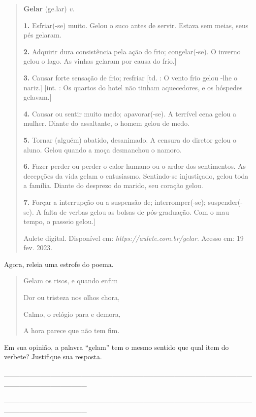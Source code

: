 \begin{quote}
\textbf{Gelar} (ge.lar)
\textit{v.}

\textbf{1.} Esfriar(-se) muito.
Gelou o suco antes de servir.
Estava sem meias, seus pés gelaram.

\textbf{2.} Adquirir dura consistência pela ação do frio; congelar(-se).
O inverno gelou o lago.
As vinhas gelaram por causa do frio.]

\textbf{3.} Causar forte sensação de frio; resfriar [td. : O vento frio gelou -lhe o nariz.] [int. : Os quartos do hotel não tinham aquecedores, e os hóspedes gelavam.]

\textbf{4.} Causar ou sentir muito medo; apavorar(-se).
A terrível cena gelou a mulher.
Diante do assaltante, o homem gelou de medo.

\textbf{5.} Tornar (alguém) abatido, desanimado.
A censura do diretor gelou o aluno.
Gelou quando a moça desmanchou o namoro.

\textbf{6.} Fazer perder ou perder o calor humano ou o ardor dos sentimentos.
As decepções da vida gelam o entusiasmo.
Sentindo-se injustiçado, gelou toda a família.
Diante do desprezo do marido, seu coração gelou.

\textbf{7.} Forçar a interrupção ou a suspensão de; interromper(-se); suspender(-se).
A falta de verbas gelou as bolsas de pós-graduação.
Com o mau tempo, o passeio gelou.]

\fonte Aulete digital. Disponível em: \emph{https://aulete.com.br/gelar}. Acesso em: 19 fev. 2023.
\end{quote}

Agora, releia uma estrofe do poema.

\begin{quote}
Gelam os risos, e quando enfim

Dor ou tristeza nos olhos chora,

Calmo, o relógio para e demora,

A hora parece que não tem fim.
\end{quote}

Em sua opinião, a palavra ``gelam'' tem o mesmo sentido que qual item do verbete? Justifique sua resposta.


\_\_\_\_\_\_\_\_\_\_\_\_\_\_\_\_\_\_\_\_\_\_\_\_\_\_\_\_\_\_\_\_\_\_\_\_\_\_\_\_\_\_\_\_\_\_\_\_\_\_\_\_\_\_\_\_\_\_\_\_\_\_\_\_

\_\_\_\_\_\_\_\_\_\_\_\_\_\_\_\_\_\_\_\_\_\_\_\_\_\_\_\_\_\_\_\_\_\_\_\_\_\_\_\_\_\_\_\_\_\_\_\_\_\_\_\_\_\_\_\_\_\_\_\_\_\_\_\_

